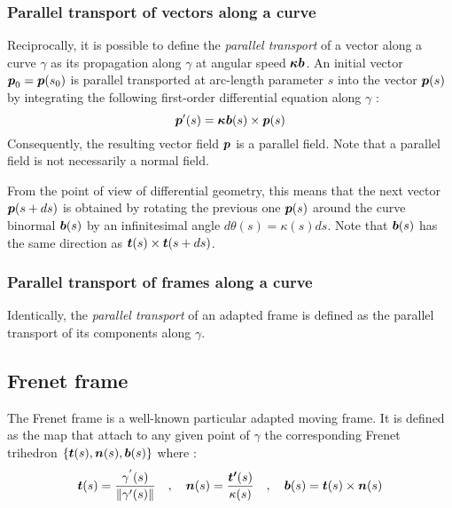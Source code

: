 \subsubsection{Parallel transport of vectors along a curve}
Reciprocally, it is possible to define the \emph{parallel transport} of a vector along a curve $\gamma$ as its propagation along $\gamma$ at angular speed $\boldsymbol{\kappa b}$. An initial vector $\boldsymbol{p}_0 = \boldsymbol{p}(s_0)$ is parallel transported at arc-length parameter $s$ into the vector $\boldsymbol{p}(s)$ by integrating the following first-order differential equation along $\gamma$ :
\begin{equation}
	\boldsymbol{p}'(s) = \boldsymbol{\kappa b}(s) \times  \boldsymbol{p}(s)
\end{equation}
Consequently, the resulting vector field $\boldsymbol{p}$ is a parallel field. Note that a parallel field is not necessarily a normal field. 

From the point of view of differential geometry, this means that the next vector $\boldsymbol{p}(s+ds)$ is obtained by rotating the previous one $\boldsymbol{p}(s)$ around the curve binormal $\boldsymbol{b}(s)$ by an infinitesimal angle $d\theta(s) = \kappa(s) ds$. Note that $\boldsymbol{b}(s)$ has the same direction as $\boldsymbol{t}(s) \times \boldsymbol{t}(s+ds)$.

\subsubsection{Parallel transport of frames along a curve}
Identically, the \emph{parallel transport} of an adapted frame is defined as the parallel transport of its components along $\gamma$.

%

\subsection{Frenet frame}

The Frenet frame is a well-known particular adapted moving frame. It is defined as the map that attach to any given point of $\gamma$ the corresponding Frenet trihedron $\{\boldsymbol{t}(s),\boldsymbol{n}(s),\boldsymbol{b}(s)\}$ where :
\begin{gather}
\boldsymbol{t}(s) = \frac{\gamma^{'}(s)}{\lVert\gamma'(s)\rVert}
\quad,\quad
\boldsymbol{n}(s) = \frac{\boldsymbol{t'}(s)}{\kappa(s)}
\quad,\quad
\boldsymbol{b}(s)= \boldsymbol{t}(s)\times\boldsymbol{n}(s)
\end{gather}


